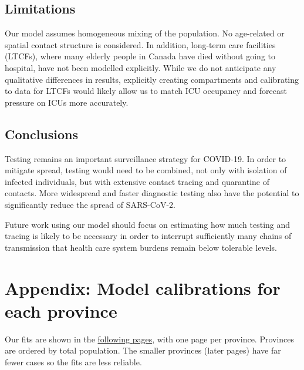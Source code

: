 \documentclass[12pt]{article}\usepackage[]{graphicx}\usepackage[]{color}
\begin{document}
\FloatBarrier


\subsection{Limitations}

Our model assumes homogeneous mixing of the population.  No
age-related or spatial contact structure is considered.  In addition,
long-term care facilities (LTCFs), where many elderly people in Canada
have died without going to hospital, have not been modelled
explicitly.  While we do not anticipate any qualitative differences in
results, explicitly creating compartments and calibrating to data for
LTCFs would likely allow us to match ICU occupancy and forecast
pressure on ICUs more accurately.

\subsection{Conclusions}


Testing remains an important surveillance strategy for COVID-19.  In
order to mitigate spread, testing would need to be combined, not only
with isolation of infected individuals, but with extensive contact
tracing and quarantine of contacts.    More
widespread and faster diagnostic testing \cite{Will+20,Wyll+20} also
have the potential to significantly reduce the spread of SARS-CoV-2.

Future work using our model should focus on estimating how much
testing and tracing is likely to be necessary in order to interrupt
sufficiently many chains of transmission that health care system
burdens remain below tolerable levels.


\clearpage

\section{Appendix: Model calibrations for each province}\label{sec:supp}

Our fits are shown in the \hyperlink{current.fits}{following pages},
with one page per province.  Provinces are ordered by total
population. The smaller provinces (later pages) have far fewer cases
so the fits are less reliable.
\end{document}
